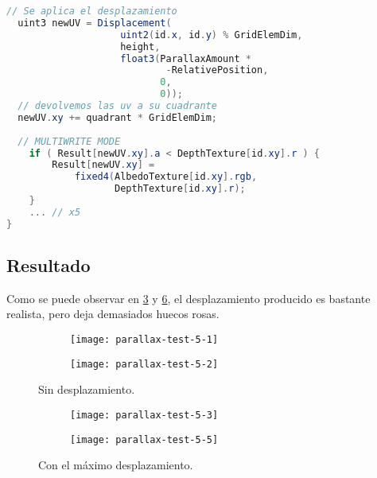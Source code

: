 \begin{lstlisting}[language=glsl]
  // Se aplica el desplazamiento
  uint3 newUV = Displacement(
                    uint2(id.x, id.y) % GridElemDim, 
                    height,
                    float3(ParallaxAmount * 
                            -RelativePosition, 
                           0, 
                           0));
  // devolvemos las uv a su cuadrante
  newUV.xy += quadrant * GridElemDim;
    
  // MULTIWRITE MODE
	if ( Result[newUV.xy].a < DepthTexture[id.xy].r ) {
		Result[newUV.xy] = 
		    fixed4(AlbedoTexture[id.xy].rgb, 
		           DepthTexture[id.xy].r);
	}
	... // x5
}
\end{lstlisting}

\subsection{Resultado}

Como se puede observar en \ref{fig:parallax-test-5-12} y \ref{fig:parallax-test-5-35}, el desplazamiento producido es bastante realista, pero deja demasiados huecos rosas.

\begin{figure}[H]
\centering
\begin{subfigure}{.47\linewidth}
	\centering
  \texttt{[image: parallax-test-5-1]}
  \caption{}
  \label{fig:parallax-test-5-1}
\end{subfigure}%
\hspace{.05\linewidth}
\begin{subfigure}{.47\linewidth}
	\centering
  \texttt{[image: parallax-test-5-2]}
  \caption{}
  \label{fig:parallax-test-5-2}
\end{subfigure}
\caption{Sin desplazamiento.}
\label{fig:parallax-test-5-12}
\end{figure}

\begin{figure}[H]
\centering
\begin{subfigure}{.47\linewidth}
	\centering
  \texttt{[image: parallax-test-5-3]}
  \caption{}
  \label{fig:parallax-test-5-3}
\end{subfigure}%
\hspace{.05\linewidth}
\begin{subfigure}{.47\linewidth}
	\centering
  \texttt{[image: parallax-test-5-5]}
  \caption{}
  \label{fig:parallax-test-5-5}
\end{subfigure}
\caption{Con el máximo desplazamiento.}
\label{fig:parallax-test-5-35}
\end{figure}
\FloatBarrier

